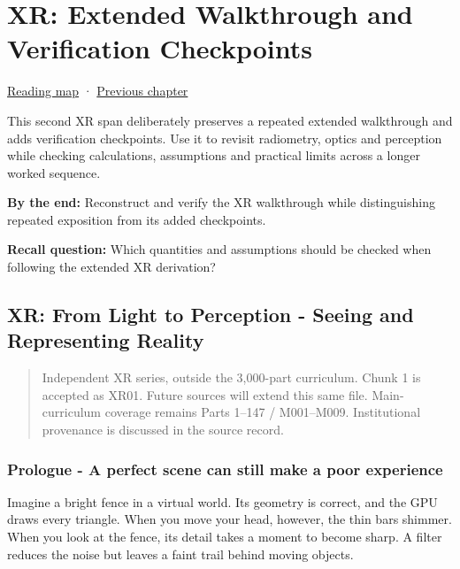 \hypertarget{04-visual-computing-ii-ch043}{}
\chapter{XR: Extended Walkthrough and Verification Checkpoints}\label{04-visual-computing-ii-ch043-xr-extended-walkthrough-and-verification-checkpoints}

\hyperref[volume-reading-map]{Reading map} · \hyperref[04-visual-computing-ii-ch042-xr-radiometry-optics-and-perception]{Previous chapter}

This second XR span deliberately preserves a repeated extended walkthrough and adds verification checkpoints. Use it to revisit radiometry, optics and perception while checking calculations, assumptions and practical limits across a longer worked sequence.

\textbf{By the end:} Reconstruct and verify the XR walkthrough while distinguishing repeated exposition from its added checkpoints.

\textbf{Recall question:} Which quantities and assumptions should be checked when following the extended XR derivation?

\section{XR: From Light to Perception - Seeing and Representing Reality}\label{04-visual-computing-ii-ch043-xr-from-light-to-perception---seeing-and-representing-reality}

\begin{quote}
Independent XR series, outside the 3,000-part curriculum. Chunk 1 is accepted as XR01. Future sources will extend this same file. Main-curriculum coverage remains Parts 1--147 / M001--M009. Institutional provenance is discussed in the source record.
\end{quote}

\subsection{Prologue - A perfect scene can still make a poor experience}\label{04-visual-computing-ii-ch043-prologue---a-perfect-scene-can-still-make-a-poor-experience}

Imagine a bright fence in a virtual world. Its geometry is correct, and the GPU draws every triangle. When you move your head, however, the thin bars shimmer. When you look at the fence, its detail takes a moment to become sharp. A filter reduces the noise but leaves a faint trail behind moving objects.

